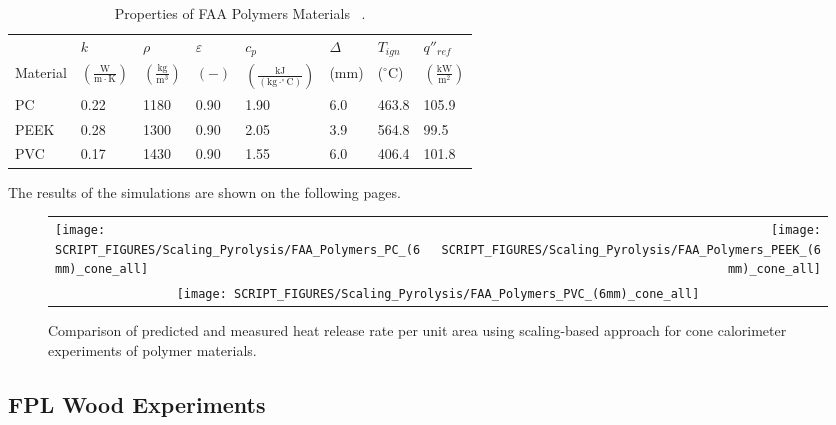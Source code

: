 \begin{table}[!h]
\caption[Properties of FAA Polymers Materials]{Properties of FAA Polymers Materials ~\cite{Stoliarov:CF2009,Stoliarov:FM2012}.}
\centering
\begin{tabular}{|p{5.5cm}|p{1.0cm}|p{1.0cm}|p{0.8cm}|p{1.4cm}|p{1.0cm}|p{1.0cm}|p{1.2cm}|}
\hline
                                               & $k$    & $\rho$      & $\varepsilon$   & $c_{p}$ & $\Delta$    & $T_{ign}$ & $q''_{ref}$ \\
Material                                       & $\mathrm{\left(\frac{W}{m\cdot K}\right)}$ & $\mathrm{\left(\frac{kg}{m^{3}}\right)}$ & $\mathrm{( - )}$ & $\mathrm{\left(\frac{kJ}{(kg\cdot ^{\circ}C)}\right)}$ &  ($\mathrm{mm}$)   & ($\mathrm{^{\circ}C}$) & $\mathrm{\left(\frac{kW}{m^{2}}\right)}$ \\ \hline
\hline
PC  & 0.22 & 1180 & 0.90 & 1.90 & 6.0 & 463.8 & 105.9 \\ \hline
PEEK  & 0.28 & 1300 & 0.90 & 2.05 & 3.9 & 564.8 & 99.5 \\ \hline
PVC  & 0.17 & 1430 & 0.90 & 1.55 & 6.0 & 406.4 & 101.8 \\ \hline
\end{tabular}
\label{Properties_FAA_Polymers_Materials_polymers}
\end{table}

The results of the simulations are shown on the following pages.

\begin{figure}[!htbp]
\begin{tabular*}{\textwidth}{l@{\extracolsep{\fill}}r}
\texttt{[image: SCRIPT\_FIGURES/Scaling\_Pyrolysis/FAA\_Polymers\_PC\_(6mm)\_cone\_all]} &
\texttt{[image: SCRIPT\_FIGURES/Scaling\_Pyrolysis/FAA\_Polymers\_PEEK\_(6mm)\_cone\_all]} \\
\multicolumn{2}{c}{\texttt{[image: SCRIPT\_FIGURES/Scaling\_Pyrolysis/FAA\_Polymers\_PVC\_(6mm)\_cone\_all]}}
\end{tabular*}
\caption[HRRPUA of FAA Polymers materials using scaling model]
{Comparison of predicted and measured heat release rate per unit area using scaling-based approach for cone calorimeter experiments of polymer materials.}
\label{FAA_Polymers_HRR_polymers}
\end{figure}

\clearpage

\subsection{FPL Wood Experiments}\label{sec_FPL_Woods_Materials}

